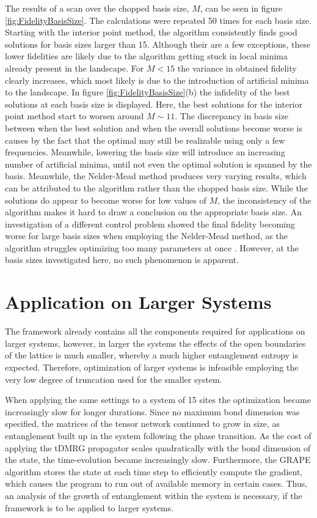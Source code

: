 The results of a scan over the chopped basis size, $M$, can be seen in figure \ref{fig:FidelityBasisSize}. The calculations were repeated 50 times for each basis size. Starting with the interior point method, the algorithm consistently finds good solutions for basis sizes larger than 15. Although their are a few exceptions, these lower fidelities are likely due to the algorithm getting stuck in local minima already present in the landscape. For $M < 15$ the variance in obtained fidelity clearly increases, which most likely is due to the introduction of artificial minima to the landscape. In figure \ref{fig:FidelityBasisSize}(b) the infidelity of the best solutions at each basis size is displayed. Here, the best solutions for the interior point method start to worsen around $M \sim 11$. The discrepancy in basis size between when the best solution and when the overall solutions become worse is causes by the fact that the optimal may still be realizable using only a few frequencies. Meanwhile, lowering the basis size will introduce an increasing number of artificial minima, until not even the optimal solution is spanned by the basis.
Meanwhile, the Nelder-Mead method produces very varying results, which can be attributed to the algorithm rather than the chopped basis size. While the solutions do appear to become worse for low values of $M$, the inconsistency of the algorithm makes it hard to draw a conclusion on the appropriate basis size. An investigation of a different control problem showed the final fidelity becoming worse for large basis sizes when employing the Nelder-Mead method, as the algorithm struggles optimizing too many parameters at once \cite{sorensen2018}. However, at the basis sizes investigated here, no such phenomenon is apparent.


\section{Application on Larger Systems} \label{sec:appLargeSystems}

The framework already contains all the components required for applications on larger systems, however, in larger the systems the effects of the open boundaries of the lattice is much smaller, whereby a much higher entanglement entropy is expected. Therefore, optimization of larger systems is infeasible employing the very low degree of truncation used for the smaller system. 

When applying the same settings to a system of 15 sites the optimization became increasingly slow for longer durations. Since no maximum bond dimension was specified, the matrices of the tensor network continued to grow in size, as entanglement built up in the system following the phase transition. As the cost of applying the tDMRG propagator scales quadratically with the bond dimension of the state, the time-evolution became increasingly slow. Furthermore, the GRAPE algorithm stores the state at each time step to efficiently compute the gradient, which causes the program to run out of available memory in certain cases. Thus, an analysis of the growth of entanglement within the system is necessary, if the framework is to be applied to larger systems.\\

